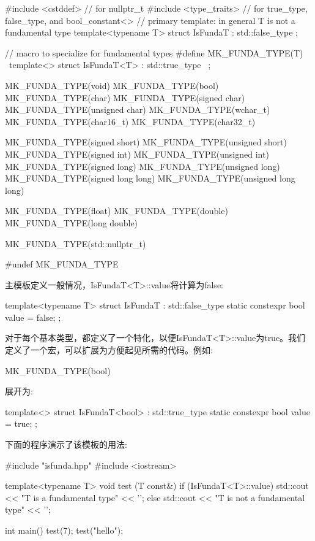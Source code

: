 \begin{cpp}
#include <cstddef> // for nullptr_t
#include <type_traits> // for true_type, false_type, and
 bool_constant<>
// primary template: in general T is not a fundamental type
template<typename T>
struct IsFundaT : std::false_type {
};

// macro to specialize for fundamental types
#define MK_FUNDA_TYPE(T) \
template<> struct IsFundaT<T> : std::true_type { \
};

MK_FUNDA_TYPE(void)
MK_FUNDA_TYPE(bool)
MK_FUNDA_TYPE(char)
MK_FUNDA_TYPE(signed char)
MK_FUNDA_TYPE(unsigned char)
MK_FUNDA_TYPE(wchar_t)
MK_FUNDA_TYPE(char16_t)
MK_FUNDA_TYPE(char32_t)

MK_FUNDA_TYPE(signed short)
MK_FUNDA_TYPE(unsigned short)
MK_FUNDA_TYPE(signed int)
MK_FUNDA_TYPE(unsigned int)
MK_FUNDA_TYPE(signed long)
MK_FUNDA_TYPE(unsigned long)
MK_FUNDA_TYPE(signed long long)
MK_FUNDA_TYPE(unsigned long long)

MK_FUNDA_TYPE(float)
MK_FUNDA_TYPE(double)
MK_FUNDA_TYPE(long double)

MK_FUNDA_TYPE(std::nullptr_t)

#undef MK_FUNDA_TYPE
\end{cpp}

主模板定义一般情况，IsFundaT<T>::value将计算为false:

\begin{cpp}
template<typename T>
struct IsFundaT : std::false_type {
	static constexpr bool value = false;
};
\end{cpp}

对于每个基本类型，都定义了一个特化，以便IsFundaT<T>::value为true。我们定义了一个宏，可以扩展为方便起见所需的代码。例如:

\begin{cpp}
MK_FUNDA_TYPE(bool)
\end{cpp}

展开为:

\begin{cpp}
template<> struct IsFundaT<bool> : std::true_type {
	static constexpr bool value = true;
};
\end{cpp}

下面的程序演示了该模板的用法:

\begin{cpp}
#include "isfunda.hpp"
#include <iostream>

template<typename T>
void test (T const&)
{
	if (IsFundaT<T>::value) {
		std::cout << "T is a fundamental type" << ’\n’;
	}
	else {
		std::cout << "T is not a fundamental type" << ’\n’;
	}
}

int main()
{
	test(7);
	test("hello");
}
\end{cpp}

